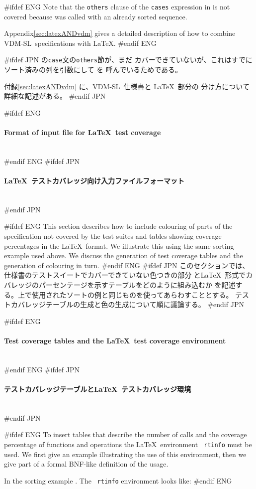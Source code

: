 \documentclass[\pformat,12pt]{article}
\newcommand{\vdmslpp}{VDM-SL}
\newcommand{\vdmslpp}{VDM++}
\newcommand{\subsubsubsection}[1]{\paragraph{#1}\mbox{}\\}
\begin{document}
#ifdef ENG
Note that the {\tt others} clause of the {\tt cases} expression in
 is not covered because
 was
called with an already sorted sequence.

Appendix\ref{sec:latexANDvdm} gives a detailed description of how to
combine \vdmslpp\ specifications with \LaTeX.
#endif ENG

#ifdef JPN
 の{\tt case}文の{\tt others}節が、まだ
カバーできていないが、これはすでにソート済みの列を引数にして
 を
呼んでいるためである。

付録\ref{sec:latexANDvdm} に、\vdmslpp\ 仕様書と \LaTeX\ 部分の
分け方について詳細な記述がある。
#endif JPN

#ifdef ENG
\subsubsubsection{Format of input file for \LaTeX\ test coverage}
#endif ENG
#ifdef JPN
\subsubsubsection{\LaTeX\ テストカバレッジ向け入力ファイルフォーマット}
#endif JPN

#ifdef ENG
This section describes how to include colouring of parts of the
specification not covered by the test suites and tables showing
coverage percentages in the \LaTeX\ format. We illustrate this using
the same sorting example used above. We discuss the generation of test
coverage tables and the generation of colouring in turn.
#endif ENG
#ifdef JPN
このセクションでは、仕様書のテストスイートでカバーできていない色つきの部分
と\LaTeX\ 形式でカバレッジのパーセンテージを示すテーブルをどのように組み込むか
を記述する。上で使用されたソートの例と同じものを使ってあらわすこととする。
テストカバレッジテーブルの生成と色の生成について順に議論する。
#endif JPN

#ifdef ENG
\subsubsubsection{Test coverage tables and the \LaTeX\ test coverage environment}
#endif ENG
#ifdef JPN
\subsubsubsection{テストカバレッジテーブルと\LaTeX\ テストカバレッジ環境}
#endif JPN

#ifdef ENG
To insert tables that describe the number of calls and the coverage
percentage of functions and operations the \LaTeX\ environment {\tt
  rtinfo} must be used.  We first give an example illustrating the use
of this environment, then we give part of a formal BNF-like definition
of the usage.

In the sorting example .  The {\tt
  rtinfo} environment looks like:
#endif ENG
\end{document}
